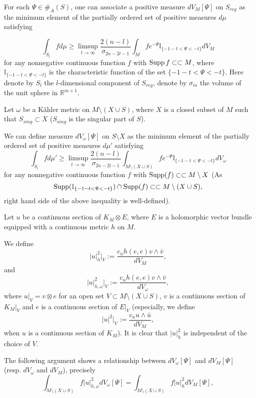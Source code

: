 \documentclass[twoside,openany,12pt]{beautynote}
\begin{document}
For each $\Psi\in\#_{A}(S)$, one can associate a positive measure
$dV_{M}[\Psi]$ on $S_{reg}$ as the minimum element of the partially
ordered set of positive measures $d\mu$ satisfying

$$\int_{S_{l}}fd\mu\geq\limsup_{t\to\infty}\frac{2(n-l)}
{\sigma_{2n-2l-1}}\int_{M}fe^{-\Psi}\mathbb{I}_{\{-1-t<\Psi<-t\}}dV_{M}$$
for any nonnegative continuous function $f$ with $\operatorname{Supp}
f\subset\subset M$, where $\mathbb{I}_{\{-1-t<\Psi<-t\}}$ is the
characteristic function of the set $\{-1-t<\Psi<-t\}$. Here denote
by $S_{l}$ the $l$-dimensional component of $S_{reg}$, denote by
$\sigma_{m}$ the volume of the unit sphere in $\mathbb{R}^{m+1}$.

Let $\omega$ be a K\"{a}hler metric on $M\setminus (X\cup S)$, where
$X$ is a closed subset of $M$ such that $S_{sing}\subset X$
($S_{sing}$ is the singular part of $S$).

We can define measure $dV_{\omega}[\Psi]$ on $S\setminus X$ as the
minimum element of the partially ordered set of positive measures
$d\mu'$ satisfying
$$\int_{S_{l}}fd\mu'\geq\limsup_{t\to\infty}\frac{2(n-l)}
{\sigma_{2n-2l-1}}\int_{M\setminus (X\cup S)}fe^{-\Psi}\mathbb{I}_{\{-1-t<\Psi<-t\}}dV_{\omega}$$
for any nonnegative continuous function $f$ with
$\operatorname{Supp} (f)\subset\subset M\setminus X$
(As $$\operatorname{Supp}(\mathbb{I}_{\{-1-t<\Psi<-t\}})\cap \operatorname{Supp}(f)\subset\subset M\setminus (X\cup S),$$
right hand side of the above inequality is well-defined).

Let $u$ be a continuous section of $K_{M}\otimes E$, where $E$ is a holomorphic vector bundle
equipped with a continuous metric $h$ on $M$.

We define
$$|u|^{2}_{h}|_{V}:=\frac{c_{n}h(e,e)v\wedge\bar{v}}{dV_{M}},$$
and
$$|u|^{2}_{h,\omega}|_{V}:=\frac{c_{n}h(e,e)v\wedge\bar{v}}{dV_{\omega}},$$
where $u|_{V}=v\otimes e$ for an open set $V\subset M\setminus (X\cup S)$, $v$ is a continuous section of
$K_{M}|_{V}$ and $e$ is a continuous
section of $E|_{V}$ (especially, we define
$$|u|^{2}|_{V}:=\frac{c_{n}u\wedge\bar{u}}{dV_{M}},$$
when $u$ is a continuous section of $K_{M}$). It is clear that
$|u|^{2}_{h}$ is independent of the choice of $V$.

The following argument shows a relationship between
$dV_{\omega}[\Psi]$ and $dV_{M}[\Psi]$ (resp. $dV_{\omega}$ and
$dV_{M}$), precisely
\begin{equation}
\label{equ:9.1}
\int_{M\setminus(X\cup S)}f|u|^{2}_{h,\omega}dV_{\omega}[\Psi]
=\int_{M\setminus(X\cup S)}f|u|^{2}_{h}dV_{M}[\Psi],
\end{equation}
\end{document}
